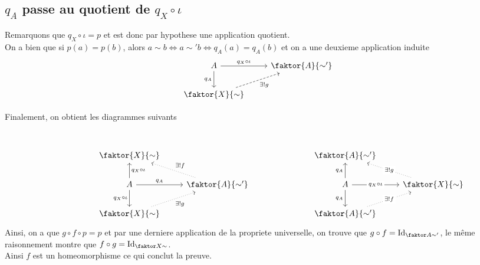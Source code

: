 \documentclass[11pt, a4paper]{article}
\DeclareMathOperator{\id}{Id}
\begin{document}
\subsection*{ $q_A$ passe au quotient de $q_X\circ \iota$ }
Remarquons que $q_X \circ \iota= p$ et est donc par hypothese une application quotient.\\

On a bien que si $p ( a) = p( b) $, alors $a\sim b \iff a\sim' b \iff q_A( a) = q_A( b) $ et on a une deuxieme application induite 
\[\begin{tikzcd}
	A & { \faktor {A} {\sim'}} \\
	{\faktor {X} {\sim}}
	\arrow["{q_A}"', from=1-1, to=2-1]
	\arrow["{q_X\circ\iota}", from=1-1, to=1-2]
	\arrow["{\exists ! g}"', dashed, from=2-1, to=1-2]
\end{tikzcd}\]

Finalement, on obtient les diagrammes suivants
\[\begin{tikzcd}
	{} \\
	&& {\faktor {X} {\sim}} &&&& {\faktor {A} {\sim'}} \\
	&& A & { \faktor {A} {\sim'}} &&& A & {\faktor {X} {\sim}} \\
	&& {\faktor {X} {\sim}} &&&& {\faktor {A} {\sim'}}
	\arrow["{q_X\circ\iota}"', from=3-3, to=4-3]
	\arrow["{q_A}", from=3-3, to=3-4]
	\arrow["{\exists ! g}"', dotted, from=4-3, to=3-4]
	\arrow["{q_X\circ\iota}"', from=3-3, to=2-3]
	\arrow["{\exists ! f}"', dotted, from=3-4, to=2-3]
	\arrow["{q_A}"', from=3-7, to=4-7]
	\arrow["{q_A}", from=3-7, to=2-7]
	\arrow["{q_X\circ \iota}"{description}, from=3-7, to=3-8]
	\arrow["{\exists ! f}"{description}, dotted, from=4-7, to=3-8]
	\arrow["{\exists ! g}"{description}, dotted, from=3-8, to=2-7]
\end{tikzcd}\]
Ainsi, on a que $g\circ f \circ p = p$ et par une derniere application de la propriete universelle, on trouve que $g\circ f = \id_{ \faktor A { \sim '} } $, le même raisonnement montre que $f\circ g = \id_{ \faktor X \sim} $.\\
Ainsi $f$ est un homeomorphisme ce qui conclut la preuve.
\end{document}

